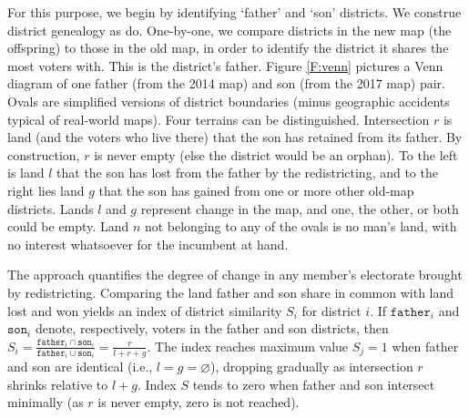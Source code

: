 \documentclass[letter,12pt]{article}
\begin{document}
For this purpose, we begin by identifying `father' and `son' districts. We construe district genealogy as \citet{cox.katz.2002} do. One-by-one, we compare districts in the new map (the offspring) to those in the old map, in order to identify the district it shares the most voters with. This is the district's father. Figure \ref{F:venn} pictures a Venn diagram of one father (from the 2014 map) and son (from the 2017 map) pair. Ovals are simplified versions of district boundaries (minus geographic accidents typical of real-world maps). Four terrains can be distinguished. Intersection $r$ is land (and the voters who live there) that the son has retained from its father. By construction, $r$ is never empty (else the district would be an orphan). To the left is land $l$ that the son has lost from the father by the redistricting, and to the right lies land $g$ that the son has gained from one or more other old-map districts. Lands $l$ and $g$ represent change in the map, and one, the other, or both could be empty. Land $n$ not belonging to any of the ovals is no man's land, with no interest whatsoever for the incumbent at hand. 

The approach quantifies the degree of change in any member's electorate brought by redistricting. Comparing the land father and son share in common with land lost and won yields an index of district similarity $S_i$ for district $i$. If {\small$\texttt{father}_i$} and {\small$\texttt{son}_i$} denote, respectively, voters in the father and son districts, then $S_i = \frac{\texttt{father}_i \cap \texttt{son}_i}{\texttt{father}_i \cup \texttt{son}_i} = \frac{r}{l+r+g}$. The index reaches maximum value $S_j=1$ when father and son are identical (i.e., $l=g=\varnothing$), dropping gradually as intersection $r$ shrinks relative to $l+g$. Index $S$ tends to zero when father and son intersect minimally (as $r$ is never empty, zero is not reached).
\end{document}

